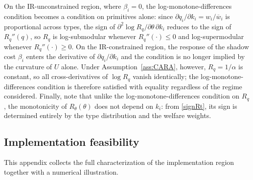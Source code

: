 \documentclass{class}
\begin{document}
\begin{remark}\label{rem:prim}
On the IR-unconstrained region, where $\beta_i=0$, the log-monotone-differences condition becomes a condition on primitives alone: since $\partial q_i/\partial k_i = w_i/\overline{w}_i$ is proportional across types, the sign of $\partial^2\log R_q/\partial\theta\,\partial k_i$ reduces to the sign of $R_q''(q)$, so $R_q$ is log-submodular whenever $R_q''(\cdot)\le 0$ and log-supermodular whenever $R_q''(\cdot)\ge 0$. On the IR-constrained region, the response of the shadow cost $\beta_i$ enters the derivative of $\partial q_i/\partial k_i$ and the condition is no longer implied by the curvature of $U$ alone. Under Assumption~\ref{ass:CARA}, however, $R_q = 1/\alpha$ is constant, so all cross-derivatives of $\log R_q$ vanish identically; the log-monotone-differences condition is therefore satisfied with equality regardless of the regime considered. Finally, note that unlike the log-monotone-differences condition on $R_q$, the monotonicity of $R_\theta(\theta)$ does not depend on $k_i$: from \ref{signRt}, its sign is determined entirely by the type distribution and the welfare weights.
\end{remark}




\subsection{Implementation feasibility}\label{appsec:implementation-region}

This appendix collects the full characterization of the implementation region together with a numerical illustration. 
\end{document}

